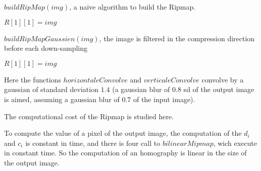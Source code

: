 \medbreak
\medbreak
\begin{algorithm}[H]
\caption{$buildRipMap(img)$, a naive algorithm to build the Ripmap.}
\label{buildRipmap1}
$R[1][1] = img$\;

\end{algorithm}
\medbreak
\medbreak
\medbreak
\medbreak
\begin{algorithm}[H]
\caption{$buildRipMapGaussien(img)$, the image is filtered in the compression direction before each down-sampling}
\label{buildRipmap2}
$R[1][1] = img$\;

\end{algorithm}
\medbreak
\medbreak

Here the functions $horizontaleConvolve$ and $verticaleConvolve$ convolve by a gaussian of standard deviation $1.4$ \cite{morel2011sift} (a gaussian blur of $0.8$ sd of the output image is aimed, assuming a gaussian blur of $0.7$ of the input image).



The computational cost of the Ripmap is studied here.

To compute the value of a pixel of the output image, the computation of the $d_i$ and $c_i$ is constant in time, and there is four call to $bilinearMipmap$, wich execute in constant time. So the computation of an homography is linear in the size of the output image.


